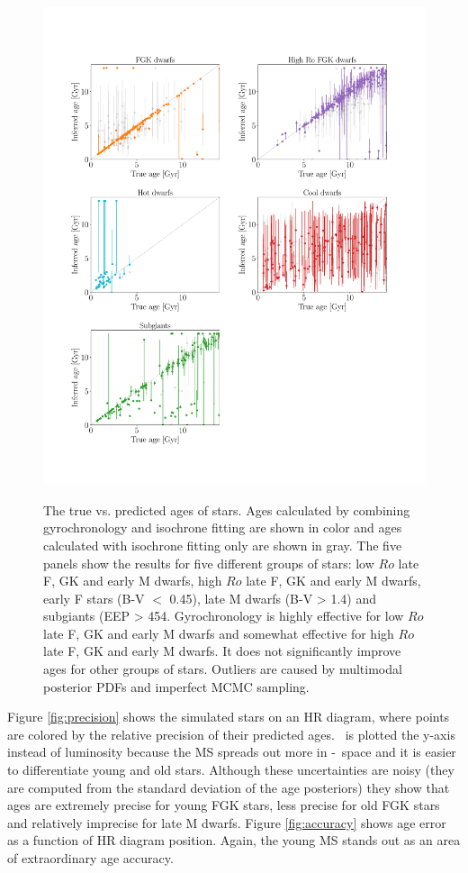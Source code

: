 \begin{figure}
  \caption{
The true vs. predicted ages of stars.
    Ages calculated by combining gyrochronology
    and isochrone fitting are shown in color and ages calculated with
    isochrone fitting only are shown in gray.
The five panels show the results for five different groups of stars: low $Ro$
late F, GK and early M dwarfs, high $Ro$ late F, GK and early M dwarfs, early
    F stars (B-V $<$ 0.45), late M dwarfs (B-V > 1.4) and subgiants (EEP > 454.
Gyrochronology is highly effective for low $Ro$ late F, GK and early M dwarfs
and somewhat effective for high $Ro$ late F, GK and early M dwarfs.
It does not significantly improve ages for other groups of stars.
Outliers are caused by multimodal posterior PDFs and imperfect MCMC sampling.
}
  \centering
    \includegraphics[width=1\textwidth]{simulation_results}
\label{fig:simulation_results}
\end{figure}

Figure \ref{fig:precision} shows the simulated stars on an HR diagram, where
points are colored by the relative precision of their predicted ages.
\logg\ is plotted the y-axis instead of luminosity because the MS spreads out
more in \teff-\logg\ space and it is easier to differentiate young and old
stars.
Although these uncertainties are noisy (they are computed from the standard
deviation of the age posteriors) they show that ages are extremely precise for
young FGK stars, less precise for old FGK stars and relatively imprecise for
late M dwarfs.
Figure \ref{fig:accuracy} shows age error as a function of HR diagram
position.
Again, the young MS stands out as an area of extraordinary age accuracy.

